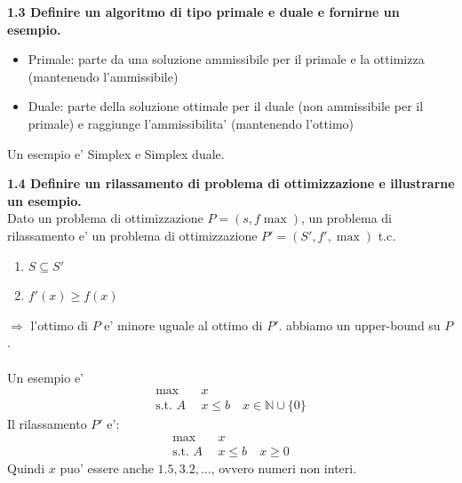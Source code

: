 \documentclass[a4paper,11pt]{article}
\newcommand{\domanda}[2]{%
  \vspace{0.6em}
  \noindent\textbf{#1}\\[0.2em]
  \noindent#2
  \vspace{1em}
  \par
}
\begin{document}
\domanda{1.3 \quad Definire un algoritmo di tipo primale e duale e fornirne un esempio.}{
\begin{itemize}
    \item Primale: parte da una soluzione ammissibile per il primale e la ottimizza (mantenendo l'ammissibile)
    \item Duale: parte della soluzione ottimale per il duale (non ammissibile per il primale) e raggiunge l'ammissibilita' (mantenendo l'ottimo)
\end{itemize}
Un esempio e' Simplex e Simplex duale.
}

\domanda{1.4 \quad Definire un rilassamento di problema di ottimizzazione e illustrarne un esempio.}{
Dato un problema di ottimizzazione $P=(s, f \max)$, un problema di rilassamento e' un problema di ottimizzazione $P'=(S', f', \max)$ t.c.
\begin{enumerate}
    \item $S \subseteq S'$
    \item $f'(x) \geq f(x)$ 
\end{enumerate}
$\Rightarrow$ l'ottimo di $P$ e' minore uguale al ottimo di $P'$. abbiamo un upper-bound su $P$.\\
\vspace{1px}\\
Un esempio e'
\begin{align*}
    \max \quad &x \\
    \text{s.t. } A&x\leq b \quad x \in \mathbb{N}\cup\{0\}
\end{align*}
Il rilassamento $P'$ e':
\begin{align*}
    \max \quad &x \\
    \text{s.t. } A &x\leq b \quad x \geq 0
\end{align*}
Quindi $x$ puo' essere anche $1.5, 3.2, \dots$, ovvero numeri non interi.
}
\end{document}
